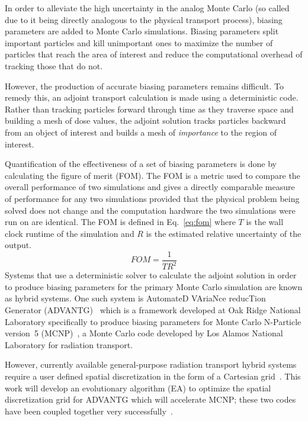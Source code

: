 \documentclass[conference]{IEEEtran}
\begin{document}
In order to alleviate the high uncertainty in the analog Monte Carlo (so called due to it being directly analogous to the physical transport process), biasing parameters are added to Monte Carlo simulations. Biasing parameters split important particles and kill unimportant ones to maximize the number of particles that reach the area of interest and reduce the computational overhead of tracking those that do not.

However, the production of accurate biasing parameters remains difficult. To remedy this, an adjoint transport calculation is made using a deterministic code. Rather than tracking particles forward through time as they traverse space and building a mesh of dose values, the adjoint solution tracks particles backward from an object of interest and builds a mesh of \textit{importance} to the region of interest.

Quantification of the effectiveness of a set of biasing parameters is done by calculating the figure of merit (FOM). The FOM is a metric used to compare the overall performance of two simulations and gives a directly comparable measure of performance for any two simulations provided that the physical problem being solved does not change and the computation hardware the two simulations were run on are identical. The FOM is defined in Eq.~\ref{eq:fom} where $T$ is the wall clock runtime of the simulation and $R$ is the estimated relative uncertainty of the output.
\begin{equation} \label{eq:fom}
FOM = \frac{1}{T R^2}
\end{equation}
Systems that use a deterministic solver to calculate the adjoint solution in order to produce biasing parameters for the primary Monte Carlo simulation are known as hybrid systems. One such system is AutomateD VAriaNce reducTion Generator (ADVANTG)~\cite{ref:Mosher2015} which is a framework developed at Oak Ridge National Laboratory specifically to produce biasing parameters for Monte Carlo N-Particle version~5 (MCNP)~\cite{ref:X5}, a Monte Carlo code developed by Los Alamos National Laboratory for radiation transport. 

However, currently available general-purpose radiation transport hybrid systems require a user defined spatial discretization in the form of a Cartesian grid~\cite{ref:Wagner2014, ref:Mosher2015}. This work will develop an evolutionary algorithm (EA) to optimize the spatial discretization grid for ADVANTG which will accelerate MCNP; these two codes have been coupled together very successfully~\cite{ref:Blakeman2007, ref:Risner2013, ref:Ibrahim2011, ref:Wagner2011}.
\end{document}

